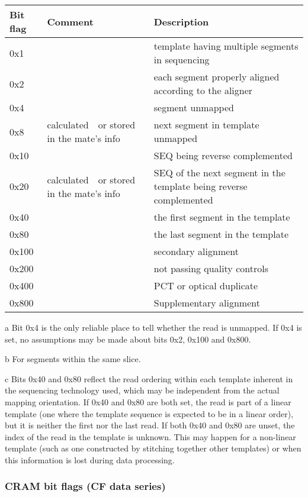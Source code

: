 \documentclass[a4paper]{article}
\begin{document}
\begin{threeparttable}[t]
\begin{tabular}{|l|l|l|}
\hline
\textbf{Bit flag} & \textbf{Comment} & \textbf{Description}\tabularnewline
\hline
0x1 &  & template having multiple segments in sequencing\tabularnewline
\hline
0x2 &  & each segment properly aligned according to the aligner\tabularnewline
\hline
0x4 &  & segment unmapped\tnote{a}\tabularnewline
\hline
0x8 & calculated\tnote{b}\ \ or stored in the mate's info & next segment in template unmapped\tabularnewline
\hline
0x10 &  & SEQ being reverse complemented\tabularnewline
\hline
0x20 & calculated\tnote{b}\ \ or stored in the mate's info & SEQ of the next segment in the
template being reverse complemented\tabularnewline
\hline
0x40 &  & the first segment in the template\tnote{c}\tabularnewline
\hline
0x80 &  & the last segment in the template\tnote{c}\tabularnewline
\hline
0x100 &  & secondary alignment\tabularnewline
\hline
0x200 &  & not passing quality controls\tabularnewline
\hline
0x400 &  & PCT or optical duplicate\tabularnewline
\hline
0x800 &  & Supplementary alignment\tabularnewline
\hline
\end{tabular}
\begin{tablenotes}
\item[a] Bit 0x4 is the only reliable place to tell whether the read is unmapped.  If 0x4 is set, no assumptions may be made about bits 0x2, 0x100 and 0x800.
\item[b] For segments within the same slice.
\item[c] Bits 0x40 and 0x80 reflect the read ordering within each template inherent in the sequencing technology used, which may be independent from the actual mapping orientation.
If 0x40 and 0x80 are both set, the read is part of a linear template (one where the template sequence is expected to be in a linear order), but it is neither the first nor the last read.
If both 0x40 and 0x80 are unset, the index of the read in the template is unknown.
This may happen for a non-linear template (such as one constructed by stitching together other templates) or when this information is lost during data processing.
\end{tablenotes}
\end{threeparttable}

\subsubsection*{CRAM bit flags (CF data series)}
\end{document}
